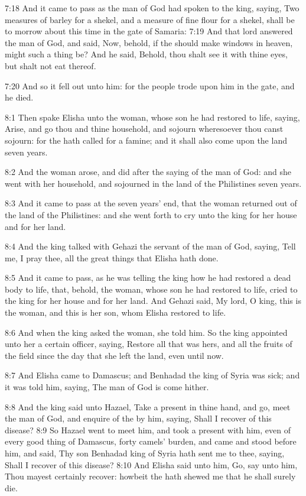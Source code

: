 7:18 And it came to pass as the man of God had spoken to the king, saying, Two measures of barley for a shekel, and a measure of fine flour for a shekel, shall be to morrow about this time in the gate of Samaria: 7:19 And that lord answered the man of God, and said, Now, behold, if the \LORD should make windows in heaven, might such a thing be? And he said, Behold, thou shalt see it with thine eyes, but shalt not eat thereof.

7:20 And so it fell out unto him: for the people trode upon him in the gate, and he died.

8:1 Then spake Elisha unto the woman, whose son he had restored to life, saying, Arise, and go thou and thine household, and sojourn wheresoever thou canst sojourn: for the \LORD hath called for a famine; and it shall also come upon the land seven years.

8:2 And the woman arose, and did after the saying of the man of God: and she went with her household, and sojourned in the land of the Philistines seven years.

8:3 And it came to pass at the seven years' end, that the woman returned out of the land of the Philistines: and she went forth to cry unto the king for her house and for her land.

8:4 And the king talked with Gehazi the servant of the man of God, saying, Tell me, I pray thee, all the great things that Elisha hath done.

8:5 And it came to pass, as he was telling the king how he had restored a dead body to life, that, behold, the woman, whose son he had restored to life, cried to the king for her house and for her land. And Gehazi said, My lord, O king, this is the woman, and this is her son, whom Elisha restored to life.

8:6 And when the king asked the woman, she told him. So the king appointed unto her a certain officer, saying, Restore all that was hers, and all the fruits of the field since the day that she left the land, even until now.

8:7 And Elisha came to Damascus; and Benhadad the king of Syria was sick; and it was told him, saying, The man of God is come hither.

8:8 And the king said unto Hazael, Take a present in thine hand, and go, meet the man of God, and enquire of the \LORD by him, saying, Shall I recover of this disease?  8:9 So Hazael went to meet him, and took a present with him, even of every good thing of Damascus, forty camels' burden, and came and stood before him, and said, Thy son Benhadad king of Syria hath sent me to thee, saying, Shall I recover of this disease?  8:10 And Elisha said unto him, Go, say unto him, Thou mayest certainly recover: howbeit the \LORD hath shewed me that he shall surely die.

